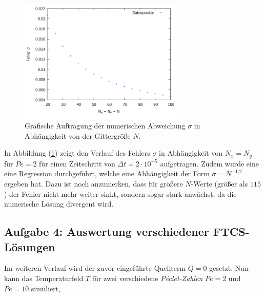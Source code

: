 \documentclass[12pt,a4paper,titlepage,headinclude,bibtotoc]{scrartcl}
\begin{document}
\begin{figure}[H]
 \centering
   \includegraphics[width=0.7\textwidth]{res/task3.png}
   \caption{Grafische Auftragung der numerischen Abweichung $\sigma$ in Abhängigkeit von der Gittergröße $N$.}
 \label{fig:task3}
\end{figure}

In Abbildung (\ref{fig:task3}) zeigt den Verlauf des Fehlers $\sigma$ in Abhängigkeit von $N_x = N_y$ für $Pe = 2$ für einen Zeitschritt von $\Delta t = 2 \cdot 10^{-5}$ aufgetragen.
Zudem wurde eine eine Regression durchgeführt, welche eine Abhängigkeit der Form $\sigma = N^{-1.2}$ ergeben hat. Dazu ist noch anzumerken, dass für größere $N$-Werte (größer als $115$) der Fehler nicht mehr weiter sinkt, sondern sogar stark anwächst, da die numerische Lösung divergent wird.


\subsection{Aufgabe 4: Auswertung verschiedener FTCS-Lösungen}
\label{sec:task4}
Im weiteren Verlauf wird der zuvor eingeführte Quellterm $Q=0$ gesetzt. Nun kann das Temperaturfeld $T$ für zwei verschiedene \textit{Péclet-Zahlen} $Pe = 2$ und $Pe = 10$ simuliert,
\end{document}
